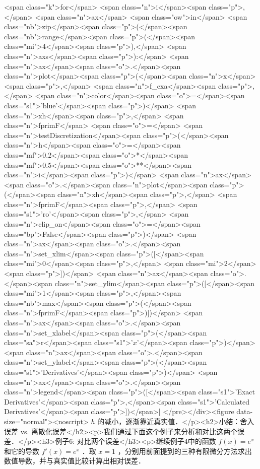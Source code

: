 <span class="k">for</span> <span class="n">i</span><span class="p">,</span> <span class="n">ax</span> <span class="ow">in</span> <span class="nb">zip</span><span class="p">(</span><span class="nb">range</span><span class="p">(</span><span class="mi">4</span><span class="p">),</span> <span class="n">axs</span><span class="p">):</span>
    <span class="n">ax</span><span class="o">.</span><span class="n">plot</span><span class="p">(</span><span class="n">x</span><span class="p">,</span> <span class="n">f_exa</span><span class="p">,</span> <span class="n">color</span><span class="o">=</span><span class="s1">'blue'</span><span class="p">)</span>
    <span class="n">xh</span><span class="p">,</span> <span class="n">fprimF</span> <span class="o">=</span> <span class="n">testDiscretization</span><span class="p">(</span><span class="n">h</span><span class="o">=</span><span class="mf">0.2</span><span class="o">*</span><span class="mf">0.5</span><span class="o">**</span><span class="n">i</span><span class="p">)</span>
    <span class="n">ax</span><span class="o">.</span><span class="n">plot</span><span class="p">(</span><span class="n">xh</span><span class="p">,</span> <span class="n">fprimF</span><span class="p">,</span> <span class="s1">'ro'</span><span class="p">,</span> <span class="n">clip_on</span><span class="o">=</span><span class="bp">False</span><span class="p">)</span>
    <span class="n">ax</span><span class="o">.</span><span class="n">set_xlim</span><span class="p">([</span><span class="mi">0</span><span class="p">,</span> <span class="mi">2</span><span class="p">])</span>
    <span class="n">ax</span><span class="o">.</span><span class="n">set_ylim</span><span class="p">([</span><span class="mi">1</span><span class="p">,</span><span class="nb">max</span><span class="p">(</span><span class="n">fprimF</span><span class="p">)])</span>
    <span class="n">ax</span><span class="o">.</span><span class="n">set_xlabel</span><span class="p">(</span><span class="sa">r</span><span class="s1">'$x$'</span><span class="p">)</span>
    <span class="n">ax</span><span class="o">.</span><span class="n">set_ylabel</span><span class="p">(</span><span class="s1">'Derivatives'</span><span class="p">)</span>
    <span class="n">ax</span><span class="o">.</span><span class="n">legend</span><span class="p">([</span><span class="s1">'Exact Derivatives'</span><span class="p">,</span><span class="s1">'Calculated Derivatives'</span><span class="p">])</span>| </pre></div><figure data-size="normal"><noscript> $h$  的减小，逐渐靠近真实值．</p><h2>小结：舍入误差 vs. 离散化误差</h2><p>我们通过下面这个例子来分析和对比这两个误差．</p><h3>例子6: 对比两个误差</h3><p>继续例子4中的函数  $f(x)=e^x$  和它的导数  $f'(x)=e^x$  ．取  $x=1$  ，分别用前面提到的三种有限微分方法求出数值导数，并与真实值比较计算出相对误差．

